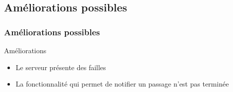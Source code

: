 \documentclass[10pt,handout,usepdftitle=false,envcountsect]{beamer}
\begin{document}
\begin{frame}
\subsection{Améliorations possibles}
\frametitle{Améliorations possibles}
\begin{block}{Améliorations}
    \begin{itemize}
        \item Le serveur présente des failles
        \item La fonctionnalité qui permet de notifier un passage n'est pas terminée
    \end{itemize}
\end{block}
\end{frame}
\end{document}
